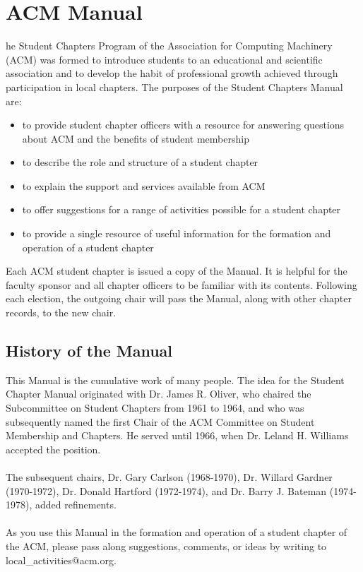 %
%
\let\textcircled=\pgftextcircled
\chapter{ACM Manual}
\label{chap:manual}

he Student Chapters Program of the Association for Computing
Machinery (ACM) was formed to introduce students to an educational and
scientific association and to develop the habit of professional growth achieved
through participation in local chapters. The purposes of the Student Chapters
Manual are:
\begin{itemize}
	\item to provide student chapter officers with a resource for answering
				questions about ACM and the benefits of student membership
  \item to describe the role and structure of a student chapter
	\item to explain the support and services available from ACM
	\item to offer suggestions for a range of activities possible for a student
				chapter
	\item to provide a single resource of useful information for the formation
				and operation of a student chapter
\end{itemize}

Each ACM student chapter is issued a copy of the Manual. It is helpful for the
faculty sponsor and all chapter officers to be familiar with its contents.
Following each election, the outgoing chair will pass the Manual, along with
other chapter records, to the new chair.

\section{History of the Manual}
\label{sec:sec01}

This Manual is the cumulative work of many people. The idea for the Student
Chapter Manual originated with Dr. James R. Oliver, who chaired the
Subcommittee on Student Chapters from 1961 to 1964, and who was subsequently
named the first Chair of the ACM Committee on Student Membership and Chapters.
He served until 1966, when Dr. Leland H. Williams accepted the position.
\\
\\
The subsequent chairs, Dr. Gary Carlson (1968-1970), Dr. Willard Gardner
(1970-1972), Dr. Donald Hartford (1972-1974), and Dr. Barry J. Bateman
(1974-1978), added refinements.
\\
\\
As you use this Manual in the formation and operation of a student chapter of
the ACM, please pass along suggestions, comments, or ideas by writing to
local\_activities@acm.org.

